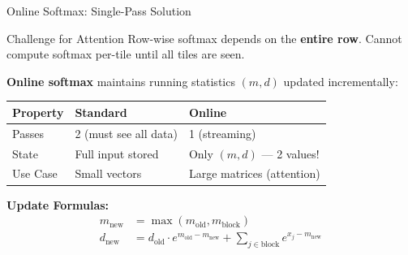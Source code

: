 \documentclass[aspectratio=169,10pt]{beamer}
\begin{document}
\begin{frame}{Online Softmax: Single-Pass Solution}
    \begin{block}{Challenge for Attention}
        Row-wise softmax depends on the \textbf{entire row}. Cannot compute softmax per-tile until all tiles are seen.
    \end{block}


    \textbf{Online softmax} maintains running statistics $(m, d)$ updated incrementally:

    \vspace{0.3cm}
    \begin{table}
        \centering
        \small
        \begin{tabular}{lll}
            \toprule
            \textbf{Property} & \textbf{Standard} & \textbf{Online} \\
            \midrule
            Passes & 2 (must see all data) & 1 (streaming) \\
            State & Full input stored & Only $(m, d)$ — 2 values! \\
            Use Case & Small vectors & Large matrices (attention) \\
            \bottomrule
        \end{tabular}
    \end{table}

    \vspace{0.5cm}
    \textbf{Update Formulas:}
    \begin{align*}
        m_{\text{new}} &= \max(m_{\text{old}}, m_{\text{block}}) \\
        d_{\text{new}} &= d_{\text{old}} \cdot e^{m_{\text{old}} - m_{\text{new}}} + \sum_{j \in \text{block}} e^{x_j - m_{\text{new}}}
    \end{align*}

\end{frame}
\end{document}
